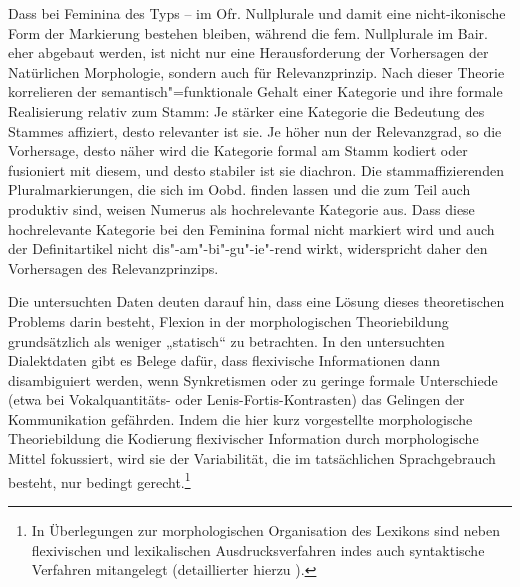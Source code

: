 Dass bei Feminina des Typs  --  im Ofr. Nullplurale und damit eine nicht-ikonische Form der Markierung bestehen bleiben, während die fem. Nullplurale im Bair. eher abgebaut werden, ist nicht nur eine Herausforderung der Vorhersagen der Natürlichen Morphologie, sondern auch für  Relevanzprinzip. Nach dieser Theorie korrelieren der semantisch"=funktionale Gehalt einer Kategorie und ihre formale Realisierung relativ zum Stamm: Je stärker eine Kategorie die Bedeutung des Stammes affiziert, desto relevanter ist sie. Je höher nun der Relevanzgrad, so die Vorhersage, desto näher wird die Kategorie formal am Stamm kodiert oder fusioniert mit diesem, und desto stabiler ist sie diachron. Die stammaffizierenden Pluralmarkierungen, die sich im Oobd. finden lassen und die zum Teil auch produktiv sind, weisen Numerus als hochrelevante Kategorie aus. Dass diese hochrelevante Kategorie bei den Feminina formal nicht markiert wird und auch der Definitartikel nicht dis"-am"-bi"-gu"-ie"-rend wirkt, widerspricht daher den Vorhersagen des Relevanzprinzips.

Die untersuchten Daten deuten darauf hin, dass eine Lösung dieses theoretischen Problems darin besteht, Flexion in der morphologischen Theoriebildung grundsätzlich als weniger „statisch“ zu betrachten. In den untersuchten Dialektdaten gibt es Belege dafür, dass flexivische Informationen dann disambiguiert werden, wenn Synkretismen oder zu geringe formale Unterschiede (etwa bei Vokalquantitäts- oder Lenis-Fortis-Kontrasten) das Gelingen der Kommunikation gefährden. Indem die hier kurz vorgestellte morphologische Theoriebildung die Kodierung flexivischer Information durch morphologische Mittel fokussiert, wird sie der Variabilität, die im tatsächlichen Sprachgebrauch besteht, nur bedingt gerecht.\footnote{\textrm{In  Überlegungen zur morphologischen Organisation des Lexikons sind neben flexivischen und lexikalischen Ausdrucksverfahren indes auch syntaktische Verfahren mitangelegt (detaillierter hierzu ).}}\largerpage[2]

